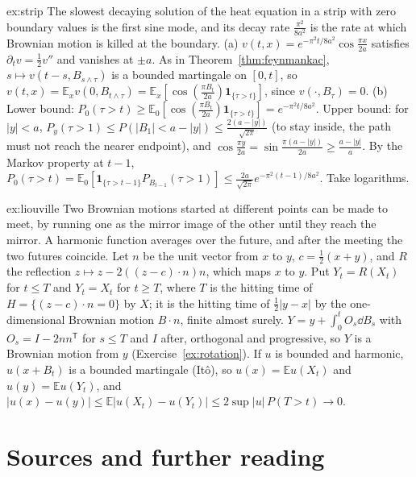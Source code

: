\begin{solution}{ex:strip}
\idea The slowest decaying solution of the heat equation in a strip with zero boundary values is the first sine mode, and its decay rate $\frac{\pi^2}{8a^2}$ is the rate at which Brownian motion is killed at the boundary.
\writeup (a) $v(t,x)=e^{-\pi^2t/8a^2}\cos\frac{\pi x}{2a}$ satisfies $\partial_tv=\frac12v''$ and vanishes at $\pm a$. As in Theorem~\ref{thm:feynmankac}, $s\mapsto v(t-s,B_{s\wedge\tau})$ is a bounded martingale on $[0,t]$, so
$v(t,x)=\mathbb E_xv(0,B_{t\wedge\tau})=\mathbb E_x[\cos(\frac{\pi B_t}{2a})\mathbf 1_{\{\tau>t\}}]$, since $v(\cdot,B_\tau)=0$. (b) Lower bound: $P_0(\tau>t)\ge\mathbb E_0[\cos(\frac{\pi B_t}{2a})\mathbf 1_{\{\tau>t\}}]=e^{-\pi^2t/8a^2}$. Upper
bound: for $|y|<a$, $P_y(\tau>1)\le P(|B_1|<a-|y|)\le\frac{2(a-|y|)}{\sqrt{2\pi}}$ (to stay inside, the path must not reach the nearer endpoint), and $\cos\frac{\pi y}{2a}=\sin\frac{\pi(a-|y|)}{2a}\ge\frac{a-|y|}a$. By the Markov
property at $t-1$, $P_0(\tau>t)=\mathbb E_0[\mathbf 1_{\{\tau>t-1\}}P_{B_{t-1}}(\tau>1)]\le\frac{2a}{\sqrt{2\pi}}e^{-\pi^2(t-1)/8a^2}$. Take logarithms.
\end{solution}

\begin{solution}{ex:liouville}
\idea Two Brownian motions started at different points can be made to meet, by running one as the mirror image of the other until they reach the mirror. A harmonic function averages over the future, and after
the meeting the two futures coincide.
\writeup Let $n$ be the unit vector from $x$ to $y$, $c=\frac12(x+y)$, and $R$ the reflection $z\mapsto z-2((z-c)\cdot n)n$, which maps $x$ to $y$. Put $Y_t=R(X_t)$ for $t\le T$ and $Y_t=X_t$ for $t\ge T$, where $T$ is the hitting time
of $H=\{(z-c)\cdot n=0\}$ by $X$; it is the hitting time of $\frac12|y-x|$ by the one-dimensional Brownian motion $B\cdot n$, finite almost surely. $Y=y+\int_0^tO_s\dd B_s$ with $O_s=I-2nn^{\mathsf T}$ for $s\le T$ and $I$ after,
orthogonal and progressive, so $Y$ is a Brownian motion from $y$ (Exercise~\ref{ex:rotation}). If $u$ is bounded and harmonic, $u(x+B_t)$ is a bounded martingale (It\^o), so $u(x)=\mathbb Eu(X_t)$ and $u(y)=\mathbb Eu(Y_t)$, and
$|u(x)-u(y)|\le\mathbb E|u(X_t)-u(Y_t)|\le2\sup|u|\,P(T>t)\to0$.
\end{solution}

\section*{Sources and further reading}

